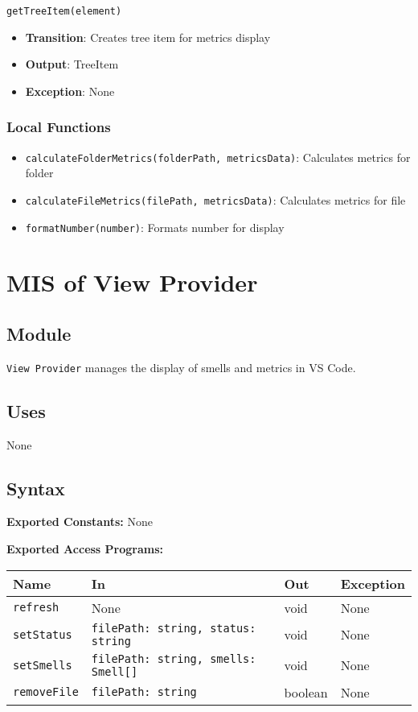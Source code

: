 \documentclass[12pt, titlepage]{article}
\begin{document}
\texttt{getTreeItem(element)}
\begin{itemize}
\item \textbf{Transition}: Creates tree item for metrics display
\item \textbf{Output}: TreeItem
\item \textbf{Exception}: None
\end{itemize}

\subsubsection{Local Functions}
\begin{itemize}
\item \texttt{calculateFolderMetrics(folderPath, metricsData)}: Calculates metrics for folder
\item \texttt{calculateFileMetrics(filePath, metricsData)}: Calculates metrics for file
\item \texttt{formatNumber(number)}: Formats number for display
\end{itemize}

\section{MIS of View Provider}

\subsection{Module}
\texttt{View Provider} manages the display of smells and metrics in VS Code.

\subsection{Uses}
None

\subsection{Syntax}

\textbf{Exported Constants:} None

\textbf{Exported Access Programs:}\\
\begin{tabularx}{\linewidth}{|l|>{\raggedright\arraybackslash}X|l|l|}
  \hline
  \textbf{Name} & \textbf{In} & \textbf{Out} & \textbf{Exception} \\
  \hline
  \texttt{refresh} & None & void & None \\ \hline
  \texttt{setStatus} & \texttt{filePath: string, status: string} & void & None \\ \hline
  \texttt{setSmells} & \texttt{filePath: string, smells: Smell[]} & void & None \\ \hline
  \texttt{removeFile} & \texttt{filePath: string} & boolean & None \\
  \hline
\end{tabularx}
\end{document}
